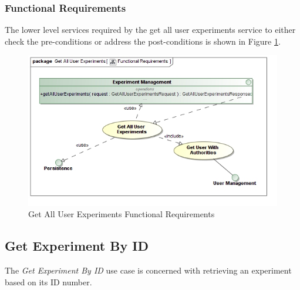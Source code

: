\subsubsection {Functional Requirements}
The lower level services required by the get all user experiments service to 
either check the pre-conditions or address the post-conditions is shown in
Figure \ref{fig:getAllUserExperimentsFunctionalRequirements}.
\begin{figure}[H]
  \begin{center}
  \includegraphics[scale=0.38]{../Diagrams and Charts/Experiment/Get All User Experiments Functional Requirements.jpg}
  \caption{Get All User Experiments Functional Requirements}
  \label{fig:getAllUserExperimentsFunctionalRequirements}
  \end{center}
\end{figure}



\subsection {Get Experiment By ID}
The \textit{Get Experiment By ID} use case is concerned with retrieving an
experiment based on its ID number.

